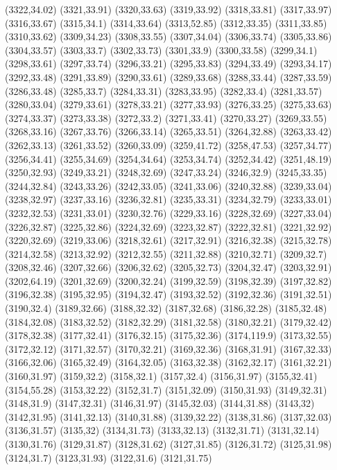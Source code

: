 (3322,34.02)
(3321,33.91)
(3320,33.63)
(3319,33.92)
(3318,33.81)
(3317,33.97)
(3316,33.67)
(3315,34.1)
(3314,33.64)
(3313,52.85)
(3312,33.35)
(3311,33.85)
(3310,33.62)
(3309,34.23)
(3308,33.55)
(3307,34.04)
(3306,33.74)
(3305,33.86)
(3304,33.57)
(3303,33.7)
(3302,33.73)
(3301,33.9)
(3300,33.58)
(3299,34.1)
(3298,33.61)
(3297,33.74)
(3296,33.21)
(3295,33.83)
(3294,33.49)
(3293,34.17)
(3292,33.48)
(3291,33.89)
(3290,33.61)
(3289,33.68)
(3288,33.44)
(3287,33.59)
(3286,33.48)
(3285,33.7)
(3284,33.31)
(3283,33.95)
(3282,33.4)
(3281,33.57)
(3280,33.04)
(3279,33.61)
(3278,33.21)
(3277,33.93)
(3276,33.25)
(3275,33.63)
(3274,33.37)
(3273,33.38)
(3272,33.2)
(3271,33.41)
(3270,33.27)
(3269,33.55)
(3268,33.16)
(3267,33.76)
(3266,33.14)
(3265,33.51)
(3264,32.88)
(3263,33.42)
(3262,33.13)
(3261,33.52)
(3260,33.09)
(3259,41.72)
(3258,47.53)
(3257,34.77)
(3256,34.41)
(3255,34.69)
(3254,34.64)
(3253,34.74)
(3252,34.42)
(3251,48.19)
(3250,32.93)
(3249,33.21)
(3248,32.69)
(3247,33.24)
(3246,32.9)
(3245,33.35)
(3244,32.84)
(3243,33.26)
(3242,33.05)
(3241,33.06)
(3240,32.88)
(3239,33.04)
(3238,32.97)
(3237,33.16)
(3236,32.81)
(3235,33.31)
(3234,32.79)
(3233,33.01)
(3232,32.53)
(3231,33.01)
(3230,32.76)
(3229,33.16)
(3228,32.69)
(3227,33.04)
(3226,32.87)
(3225,32.86)
(3224,32.69)
(3223,32.87)
(3222,32.81)
(3221,32.92)
(3220,32.69)
(3219,33.06)
(3218,32.61)
(3217,32.91)
(3216,32.38)
(3215,32.78)
(3214,32.58)
(3213,32.92)
(3212,32.55)
(3211,32.88)
(3210,32.71)
(3209,32.7)
(3208,32.46)
(3207,32.66)
(3206,32.62)
(3205,32.73)
(3204,32.47)
(3203,32.91)
(3202,64.19)
(3201,32.69)
(3200,32.24)
(3199,32.59)
(3198,32.39)
(3197,32.82)
(3196,32.38)
(3195,32.95)
(3194,32.47)
(3193,32.52)
(3192,32.36)
(3191,32.51)
(3190,32.4)
(3189,32.66)
(3188,32.32)
(3187,32.68)
(3186,32.28)
(3185,32.48)
(3184,32.08)
(3183,32.52)
(3182,32.29)
(3181,32.58)
(3180,32.21)
(3179,32.42)
(3178,32.38)
(3177,32.41)
(3176,32.15)
(3175,32.36)
(3174,119.9)
(3173,32.55)
(3172,32.12)
(3171,32.57)
(3170,32.21)
(3169,32.36)
(3168,31.91)
(3167,32.33)
(3166,32.06)
(3165,32.49)
(3164,32.05)
(3163,32.38)
(3162,32.17)
(3161,32.21)
(3160,31.97)
(3159,32.2)
(3158,32.1)
(3157,32.4)
(3156,31.97)
(3155,32.41)
(3154,55.28)
(3153,32.22)
(3152,31.7)
(3151,32.09)
(3150,31.93)
(3149,32.31)
(3148,31.9)
(3147,32.31)
(3146,31.97)
(3145,32.03)
(3144,31.88)
(3143,32)
(3142,31.95)
(3141,32.13)
(3140,31.88)
(3139,32.22)
(3138,31.86)
(3137,32.03)
(3136,31.57)
(3135,32)
(3134,31.73)
(3133,32.13)
(3132,31.71)
(3131,32.14)
(3130,31.76)
(3129,31.87)
(3128,31.62)
(3127,31.85)
(3126,31.72)
(3125,31.98)
(3124,31.7)
(3123,31.93)
(3122,31.6)
(3121,31.75)
